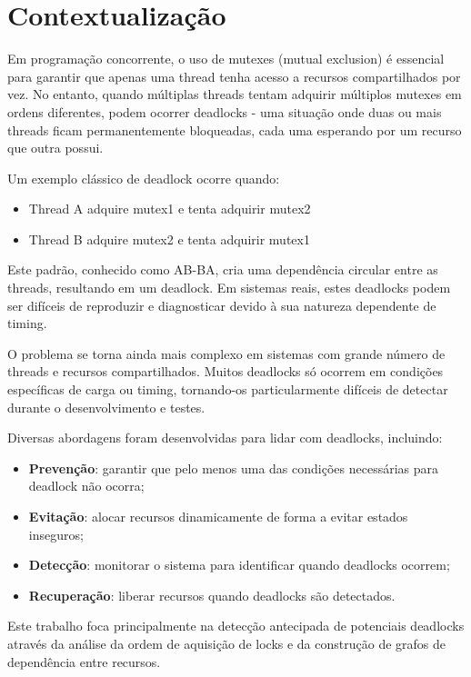 \section{Contextualização}\label{sec:contexto}

Em programação concorrente, o uso de mutexes (mutual exclusion) é essencial para garantir que apenas uma thread tenha acesso a recursos compartilhados por vez. No entanto, quando múltiplas threads tentam adquirir múltiplos mutexes em ordens diferentes, podem ocorrer deadlocks - uma situação onde duas ou mais threads ficam permanentemente bloqueadas, cada uma esperando por um recurso que outra possui.

Um exemplo clássico de deadlock ocorre quando:
\begin{itemize}
    \item Thread A adquire mutex1 e tenta adquirir mutex2
    \item Thread B adquire mutex2 e tenta adquirir mutex1
\end{itemize}

Este padrão, conhecido como AB-BA, cria uma dependência circular entre as threads, resultando em um deadlock. Em sistemas reais, estes deadlocks podem ser difíceis de reproduzir e diagnosticar devido à sua natureza dependente de timing.

O problema se torna ainda mais complexo em sistemas com grande número de threads e recursos compartilhados. Muitos deadlocks só ocorrem em condições específicas de carga ou timing, tornando-os particularmente difíceis de detectar durante o desenvolvimento e testes.

Diversas abordagens foram desenvolvidas para lidar com deadlocks, incluindo:

\begin{itemize}
    \item \textbf{Prevenção}: garantir que pelo menos uma das condições necessárias para deadlock não ocorra;
    \item \textbf{Evitação}: alocar recursos dinamicamente de forma a evitar estados inseguros;
    \item \textbf{Detecção}: monitorar o sistema para identificar quando deadlocks ocorrem;
    \item \textbf{Recuperação}: liberar recursos quando deadlocks são detectados.
\end{itemize}

Este trabalho foca principalmente na detecção antecipada de potenciais deadlocks através da análise da ordem de aquisição de locks e da construção de grafos de dependência entre recursos.

